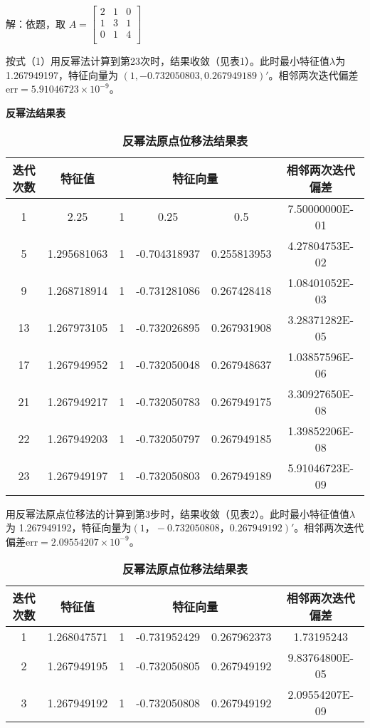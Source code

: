\documentclass[12pt, a4paper, oneside]{ctexart}
\begin{document}
解：依题，取
$A = \begin{bmatrix}
	2 & 1 & 0 \\
	1 & 3 & 1 \\
	0 & 1 & 4 \\
\end{bmatrix}$


按式（1）用反幂法计算到第23次时，结果收敛（见表1）。此时最小特征值$\lambda$为   1.267949197，特征向量为 $(1, -0.732050803, 0.267949189)'$。相邻两次迭代偏差 $\text{err} = 5.91046723 \times 10^{-9}$。


\begin{table}[h]
	\centering
	\caption{\textbf{反幂法结果表}}
	\begin{tabular}{c|c|ccc|c}
		\hline
		迭代次数 & 特征值         & \multicolumn{3}{c|}{特征向量}      & 相邻两次迭代偏差       \\ \hline
		1    & 2.25        & 1 & 0.25         & 0.5         & 7.50000000E-01 \\
		5    & 1.295681063 & 1 & -0.704318937 & 0.255813953 & 4.27804753E-02 \\
		9    & 1.268718914 & 1 & -0.731281086 & 0.267428418 & 1.08401052E-03 \\
		13   & 1.267973105 & 1 & -0.732026895 & 0.267931908 & 3.28371282E-05 \\
		17   & 1.267949952 & 1 & -0.732050048 & 0.267948637 & 1.03857596E-06 \\
		21   & 1.267949217 & 1 & -0.732050783 & 0.267949175 & 3.30927650E-08 \\
		22   & 1.267949203 & 1 & -0.732050797 & 0.267949185 & 1.39852206E-08 \\
		23   & 1.267949197 & 1 & -0.732050803 & 0.267949189 & 5.91046723E-09 \\ \hline
	\end{tabular}
	
	\vspace{1em} %
	
	\raggedright
		{用反幂法原点位移法的计算到第3步时，结果收敛（见{表2}）。此时最小特征值值$\lambda$为 1.267949192，特征向量为$(1，-0.732050808，0.267949192)'$。相邻两次迭代偏差$\text{err}=2.09554207 \times 10^{-9}$。
	}
	
	
	
	\caption{\textbf{反幂法原点位移法结果表}}
	
	\begin{tabular}{c|c|ccc|c}
		\hline
		迭代次数 & 特征值         & \multicolumn{3}{c|}{特征向量}      & 相邻两次迭代偏差       \\ \hline
		1    & 1.268047571 & 1 & -0.731952429 & 0.267962373 & 1.73195243     \\
		2    & 1.267949195 & 1 & -0.732050805 & 0.267949192 & 9.83764800E-05 \\
		3    & 1.267949192 & 1 & -0.732050808 & 0.267949192 & 2.09554207E-09 \\ \hline
	\end{tabular}
	

\end{table}
\end{document}
